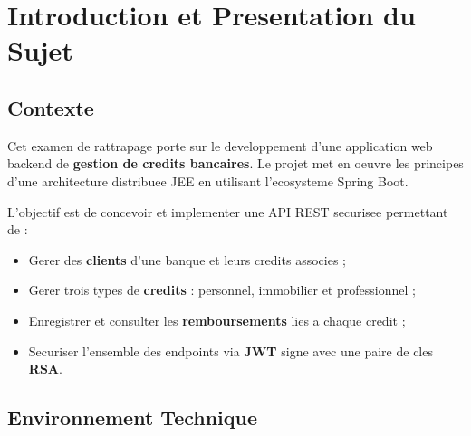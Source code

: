 \documentclass[12pt,a4paper]{report}
\begin{document}
\tableofcontents
\newpage

\chapter{Introduction et Presentation du Sujet}

\section{Contexte}

Cet examen de rattrapage porte sur le developpement d'une application web
backend de \textbf{gestion de credits bancaires}. Le projet met en oeuvre les
principes d'une architecture distribuee JEE en utilisant l'ecosysteme Spring
Boot.

L'objectif est de concevoir et implementer une API REST securisee permettant de :
\begin{itemize}
    \item Gerer des \textbf{clients} d'une banque et leurs credits associes ;
    \item Gerer trois types de \textbf{credits} : personnel, immobilier et
          professionnel ;
    \item Enregistrer et consulter les \textbf{remboursements} lies a chaque
          credit ;
    \item Securiser l'ensemble des endpoints via \textbf{JWT} signe avec une
          paire de cles \textbf{RSA}.
\end{itemize}

\section{Environnement Technique}
\end{document}
